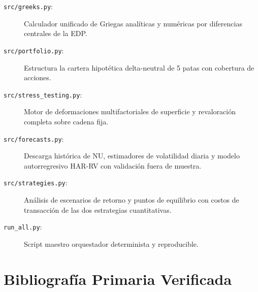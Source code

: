 \documentclass[11pt,a4paper]{article}
\begin{document}
\begin{description}
    \item[\texttt{src/greeks.py}:] Calculador unificado de Griegas analíticas y numéricas por diferencias centrales de la EDP.
    \item[\texttt{src/portfolio.py}:] Estructura la cartera hipotética delta-neutral de 5 patas con cobertura de acciones.
    \item[\texttt{src/stress\_testing.py}:] Motor de deformaciones multifactoriales de superficie y revaloración completa sobre cadena fija.
    \item[\texttt{src/forecasts.py}:] Descarga histórica de NU, estimadores de volatilidad diaria y modelo autorregresivo HAR-RV con validación fuera de muestra.
    \item[\texttt{src/strategies.py}:] Análisis de escenarios de retorno y puntos de equilibrio con costos de transacción de las dos estrategias cuantitativas.
    \item[\texttt{run\_all.py}:] Script maestro orquestador determinista y reproducible.
\end{description}

\newpage
\section{Bibliografía Primaria Verificada}
\end{document}
